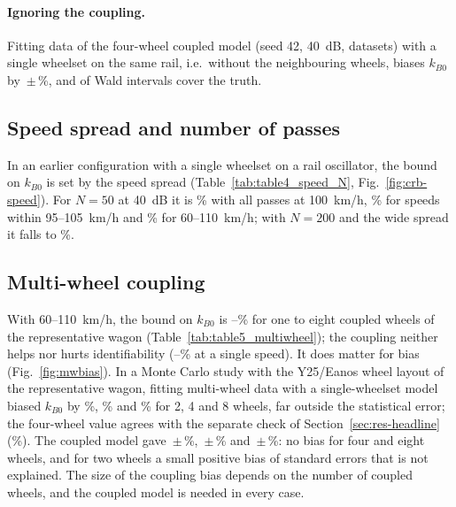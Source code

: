 \paragraph{Ignoring the coupling.} Fitting data of the four-wheel coupled model (seed 42, 40~dB,
\IgnoreCouplingN{} datasets) with a single wheelset on the same rail, i.e.\ without the neighbouring
wheels, biases $k_{B0}$ by \IgnoreCouplingForty\,$\pm$\,\IgnoreCouplingFortySE\%, and
\IgnoreCouplingCovered{} of \IgnoreCouplingN{} Wald intervals cover the truth.


\subsection{Speed spread and number of passes}\label{sec:res-speed}
In an earlier configuration with a single wheelset on a rail oscillator, the bound on $k_{B0}$ is set by
the speed spread (Table~\ref{tab:table4_speed_N},
Fig.~\ref{fig:crb-speed}). For $N=50$ at 40~dB it is \SpeedCRBFixed\% with all passes at 100~km/h,
\SpeedCRBNarrow\% for speeds within 95--105~km/h and \SpeedCRBWide\% for 60--110~km/h; with $N=200$
and the wide spread it falls to \SpeedCRBWideTwoHundred\%.


\subsection{Multi-wheel coupling}\label{sec:res-multiwheel}
With 60--110~km/h, the bound on $k_{B0}$ is \MWCRBMin--\MWCRBMax\% for one to eight coupled wheels of
the representative wagon (Table~\ref{tab:table5_multiwheel}); the coupling neither helps nor hurts
identifiability (\MWCRBFixedMin--\MWCRBFixedMax\% at a single speed). It does matter for bias
(Fig.~\ref{fig:mwbias}). In a Monte Carlo study with the Y25/Eanos wheel layout of the representative
wagon, fitting multi-wheel data with a single-wheelset model biased $k_{B0}$ by \MWSingleBiasTwo\%,
\MWSingleBiasFour\% and \MWSingleBiasEight\% for 2, 4 and 8 wheels, far outside the statistical error;
the four-wheel value agrees with the separate check of Section~\ref{sec:res-headline}
(\IgnoreCouplingForty\%). The coupled model gave \MWCorrectBiasTwo\,$\pm$\,\MWCorrectBiasSETwo\%,
\MWCorrectBiasFour\,$\pm$\,\MWCorrectBiasSEFour\% and \MWCorrectBiasEight\,$\pm$\,\MWCorrectBiasSEEight\%:
no bias for four and eight wheels, and for two wheels a small positive bias of \MWCorrectZTwo{} standard
errors that is not explained. The size of the coupling bias depends on the number of coupled wheels,
and the coupled model is needed in every case.

